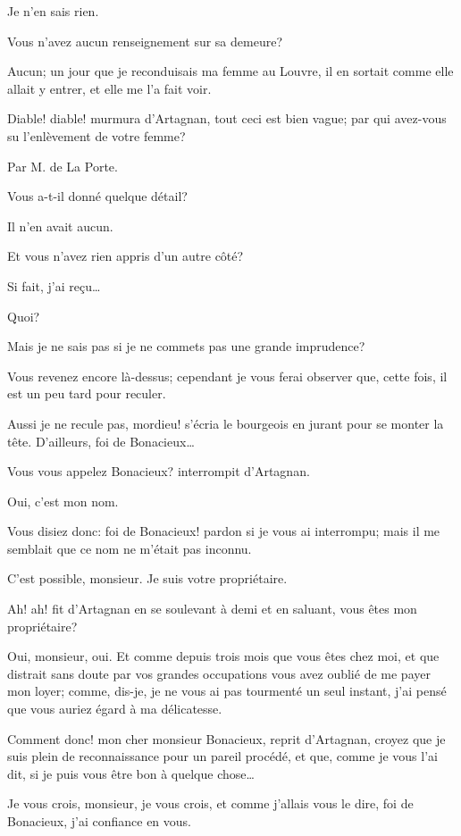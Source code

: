 \speak  Je n'en sais rien. 

\speak  Vous n'avez aucun renseignement sur sa demeure? 

\speak  Aucun; un jour que je reconduisais ma femme au Louvre, il en sortait comme elle allait y entrer, et elle me l'a fait voir. 

\speak  Diable! diable! murmura d'Artagnan, tout ceci est bien vague; par qui avez-vous su l'enlèvement de votre femme? 

\speak  Par M. de La Porte. 

\speak  Vous a-t-il donné quelque détail? 

\speak  Il n'en avait aucun. 

\speak  Et vous n'avez rien appris d'un autre côté? 

\speak  Si fait, j'ai reçu\dots 

\speak  Quoi? 

\speak  Mais je ne sais pas si je ne commets pas une grande imprudence? 

\speak  Vous revenez encore là-dessus; cependant je vous ferai observer que, cette fois, il est un peu tard pour reculer. 

\speak  Aussi je ne recule pas, mordieu! s'écria le bourgeois en jurant pour se monter la tête. D'ailleurs, foi de Bonacieux\dots 

\speak  Vous vous appelez Bonacieux? interrompit d'Artagnan. 

\speak  Oui, c'est mon nom. 

\speak  Vous disiez donc: foi de Bonacieux! pardon si je vous ai interrompu; mais il me semblait que ce nom ne m'était pas inconnu. 

\speak  C'est possible, monsieur. Je suis votre propriétaire. 

\speak  Ah! ah! fit d'Artagnan en se soulevant à demi et en saluant, vous êtes mon propriétaire? 

\speak  Oui, monsieur, oui. Et comme depuis trois mois que vous êtes chez moi, et que distrait sans doute par vos grandes occupations vous avez oublié de me payer mon loyer; comme, dis-je, je ne vous ai pas tourmenté un seul instant, j'ai pensé que vous auriez égard à ma délicatesse. 

\speak  Comment donc! mon cher monsieur Bonacieux, reprit d'Artagnan, croyez que je suis plein de reconnaissance pour un pareil procédé, et que, comme je vous l'ai dit, si je puis vous être bon à quelque chose\dots 

\speak  Je vous crois, monsieur, je vous crois, et comme j'allais vous le dire, foi de Bonacieux, j'ai confiance en vous. 

